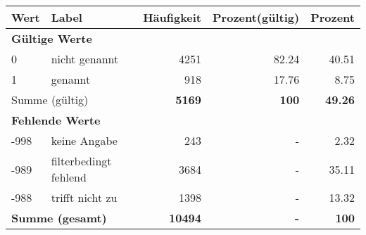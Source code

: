      \begin{longtable}{lXrrr}
     \toprule
     \textbf{Wert} & \textbf{Label} & \textbf{Häufigkeit} & \textbf{Prozent(gültig)} & \textbf{Prozent} \\
     \endhead
     \midrule
     \multicolumn{5}{l}{\textbf{Gültige Werte}}\\

     0 &
     \multicolumn{1}{X}{ nicht genannt   } &


       \num{4251} &
       \num[round-mode=places,round-precision=2]{82.24} &
         \num[round-mode=places,round-precision=2]{40.51} \\

     1 &
     \multicolumn{1}{X}{ genannt   } &


       \num{918} &
       \num[round-mode=places,round-precision=2]{17.76} &
         \num[round-mode=places,round-precision=2]{8.75} \\
     \midrule
     \multicolumn{2}{l}{Summe (gültig)} &
       \textbf{\num{5169}} &
     \textbf{\num{100}} &
       \textbf{\num[round-mode=places,round-precision=2]{49.26}} \\
     \multicolumn{5}{l}{\textbf{Fehlende Werte}}\\
       -998 &
       keine Angabe &
         \num{243} &
        - &
         \num[round-mode=places,round-precision=2]{2.32} \\
       -989 &
       filterbedingt fehlend &
         \num{3684} &
        - &
         \num[round-mode=places,round-precision=2]{35.11} \\
       -988 &
       trifft nicht zu &
         \num{1398} &
        - &
         \num[round-mode=places,round-precision=2]{13.32} \\
     \midrule
     \multicolumn{2}{l}{\textbf{Summe (gesamt)}} &
          \textbf{\num{10494}} &
        \textbf{-} &
        \textbf{\num{100}} \\
     \bottomrule
     \end{longtable}
     
